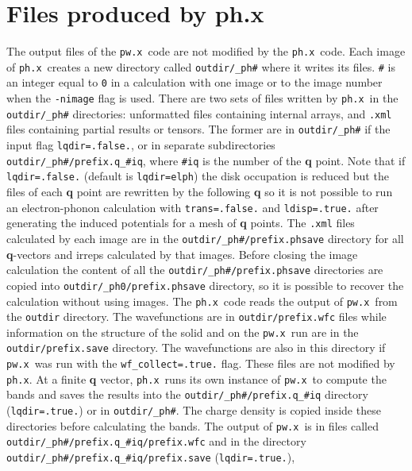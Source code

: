 \documentclass[12pt,a4paper]{article}
\def\pwx{\texttt{pw.x}}
\def\phx{\texttt{ph.x}}
\begin{document}
\section{Files produced by ph.x}

The output files of the \pwx\ code are not modified by the \phx\ code. 
Each image of \phx\ creates a new directory called \texttt{outdir/\_ph\#} 
where it writes its files. \texttt{\#} is an integer equal to \texttt{0} 
in a calculation with one image or to the image number when the 
\texttt{-nimage} flag is used. 
There are two sets of files written 
by \phx\ in the \texttt{outdir/\_ph\#} directories: unformatted files 
containing internal arrays, and \texttt{.xml} 
files containing partial results or tensors. The former are in 
\texttt{outdir/\_ph\#} if the input flag \texttt{lqdir=.false.}, or in 
separate subdirectories \texttt{outdir/\_ph\#/prefix.q\_\#iq},
where \texttt{\#iq} is the number of the {\bf q} point. Note that if 
\texttt{lqdir=.false.} (default is \texttt{lqdir=elph})
the disk occupation is reduced but the files of each {\bf q} point are
rewritten by the following {\bf q} so it is not possible to run an 
electron-phonon calculation with \texttt{trans=.false.} and 
\texttt{ldisp=.true.} after generating the induced potentials for a mesh of 
{\bf q} points. 
The \texttt{.xml} files calculated by each image are in the 
\texttt{outdir/\_ph\#/{prefix}.phsave} directory for all {\bf q}-vectors and 
irreps calculated by that images. Before closing the image calculation 
the content of all the \texttt{outdir/\_ph\#/{prefix}.phsave}
directories are copied into \texttt{outdir/\_ph0/{prefix}.phsave} directory, so
it is possible to recover the calculation without using images.
The \phx\ code reads the output of \pwx\ from the \texttt{outdir} directory. 
The wavefunctions are in \texttt{outdir/{prefix}.wfc} files 
while information on the structure of the solid and on the \pwx\ 
run are in the \texttt{outdir/{prefix}.save} directory. The wavefunctions are 
also in this directory if \pwx\ was run with the \texttt{wf\_collect=.true.} 
flag. These files are not modified by \phx. 
At a finite {\bf q} vector, \phx\ runs its own instance of \pwx\
to compute the bands and saves the results into 
the \texttt{outdir/\_ph\#/prefix.q\_\#iq} directory (\texttt{lqdir=.true.}) or
in \texttt{outdir/\_ph\#}. The charge density is copied inside 
these directories before calculating the bands. The output of \pwx\ is 
in files called \texttt{outdir/\_ph\#/prefix.q\_\#iq/{prefix}.wfc} and in 
the directory 
{\tt outdir/\_ph\#/prefix.q\_\#iq/prefix.save} (\texttt{lqdir=.true.}),
\end{document}
